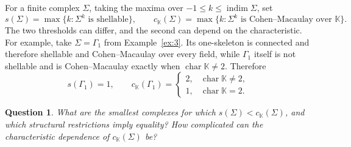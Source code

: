 \documentclass[11pt]{amsart}
\newcommand{\K}{\mathbb K}
\DeclareMathOperator{\indim}{indim}
\newtheorem{question}[theorem]{Question}
\theoremstyle{definition}
\begin{document}
	For a finite complex $\Sigma$, taking the maxima over $-1\leq k\leq\indim\Sigma$, set
	\[
	s(\Sigma)=\max\{k:\Sigma^k\text{ is shellable}\},\qquad
	c_{\K}(\Sigma)=\max\{k:\Sigma^k\text{ is Cohen--Macaulay over }\K\}.
	\]
	The two thresholds can differ, and the second can depend on the characteristic. For example, take $\Sigma=\Gamma_1$ from Example~\ref{ex:3}. Its one-skeleton is connected and therefore shellable and Cohen--Macaulay over every field, while $\Gamma_1$ itself is not shellable and is Cohen--Macaulay exactly when $\operatorname{char}\K\ne2$. Therefore
	\[
	s(\Gamma_1)=1,\qquad
	c_{\K}(\Gamma_1)=
	\begin{cases}
		2,&\operatorname{char}\K\ne2,\\
		1,&\operatorname{char}\K=2.
	\end{cases}
	\]
	
	\begin{question}\label{q:thresholds}
		What are the smallest complexes for which $s(\Sigma)<c_{\K}(\Sigma)$, and which structural restrictions imply equality? How complicated can the characteristic dependence of $c_{\K}(\Sigma)$ be?
	\end{question}
	
\end{document}
